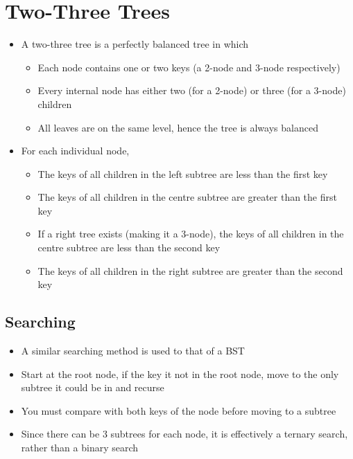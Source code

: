 
\section*{Two-Three Trees}

\begin{itemize}
  \item A two-three tree is a perfectly balanced tree in which
  \begin{itemize}
    \item Each node contains one or two keys (a 2-node and 3-node respectively)
    \item Every internal node has either two (for a 2-node) or three (for a 3-node) children
    \item All leaves are on the same level, hence the tree is always balanced
  \end{itemize}
  \item For each individual node,
  \begin{itemize}
    \item The keys of all children in the left subtree are less than the first key
    \item The keys of all children in the centre subtree are greater than the first key
    \item If a right tree exists (making it a 3-node), the keys of all children in the centre subtree are less than the second key
    \item The keys of all children in the right subtree are greater than the second key
  \end{itemize}
\end{itemize}

\subsection*{Searching}

\begin{itemize}
  \item A similar searching method is used to that of a BST
  \item Start at the root node, if the key it not in the root node, move to the only subtree it could be in and recurse
  \item You must compare with both keys of the node before moving to a subtree
  \item Since there can be 3 subtrees for each node, it is effectively a ternary search, rather than a binary search
\end{itemize}

